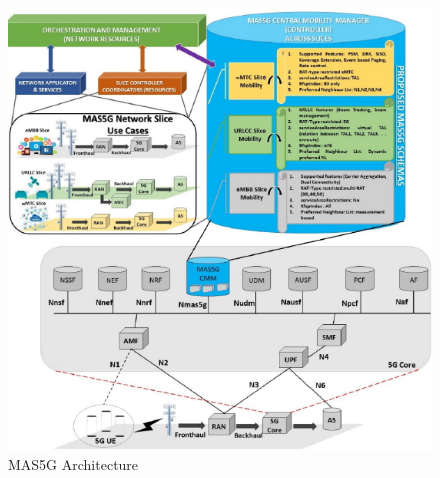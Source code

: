 

\begin{figure}[H]
\centering
\includegraphics[scale=2.3]{src/Figures/chap1/chap1-fig03.jpg}
\caption{MAS5G Architecture}\label{chap1-fig03}
\end{figure}

